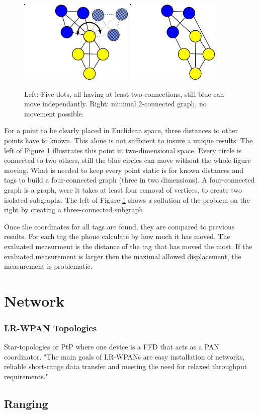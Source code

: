 \begin{figure}[ht!]
	\includegraphics[height=150px]{graphics/schematics/connected_dots.png}
	\includegraphics[height=150px]{graphics/schematics/connected_dots_k_connected.png}
	\caption{ Left: Five dots, all having at least two connections, still blue can move independantly. Right: minimal 2-connected graph, no movement possible. }
	\label{f:connected_dots}
\end{figure}

For a point to be clearly placed in Euclidean space, three distances to other points have to known.
This alone is not sufficient to insure a unique results.
The left of Figure \ref{f:connected_dots} illustrates this point in two-dimensional space.
Every circle is connected to two others, still the blue circles can move without the whole figure moving.
What is needed to keep every point static is for known distances and tags to build a four-connected graph (three in two dimensions).
A four-connected graph is a graph, were it takes at least four removal of vertices, to create two isolated subgraphs.
The left of Figure \ref{f:connected_dots} shows a sollution of the problem on the right by creating a three-connected subgraph.

Once the coordinates for all tags are found, they are compared to previous results.
For each tag the phone calculate by how much it has moved.
The evaluated measurment is the distance of the tag that has moved the most.
If the evaluated measurement is larger then the maximal allowed displacement, the measurement is problematic.



\section{Network}
\label{s:network}

\subsubsection{LR-WPAN Topologies}
Star-topologies or PtP where one device is a FFD that acts as a PAN coordinator.
"The main goals of LR-WPANs are easy installation of networks, reliable short-range data transfer and meeting the need for relaxed throughput requirements."

\subsection{Ranging}